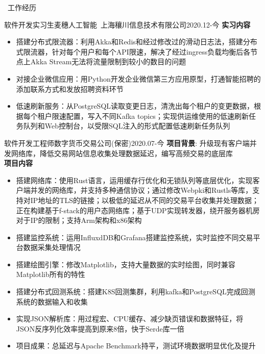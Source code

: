 \documentclass[UTF8]{resume}
\begin{document}
\begin{rSection}{\faBriefcase~工作经历}
    \begin{rExperience}{软件开发实习生}{麦穗人工智能~上海穰川信息技术有限公司}{2020.12-今}
        \textbf{实习内容}
        \begin{itemize}
            \itemsep -0.5em \vspace{-0.5em}
            \item 搭建分布式限流器：利用Akka和Redis和经过修改过的滑动日志法，搭建分布式限流器，针对每个用户和每个API限速，解决了经过ingress负载均衡后各节点上Akka Stream无法将流量限制到较小的数目的问题
            \item 对接企业微信应用：用Python开发企业微信第三方应用原型，打通智能招聘的添加联系方式和发放招聘资料环节
            \item 低速刷新服务：从PostgreSQL读取变更日志，清洗出每个租户的变更数据，根据每个租户限速配置，写入不同Kafka topics；实现供运维使用的低速刷新任务队列和Web控制台，以受限SQL注入的形式配置低速刷新任务队列
        \end{itemize}
    \end{rExperience}
    \begin{rExperience}{软件开发工程师}{数字货币交易公司(保密)}{2020.07-今}
        \textbf{项目背景}:
        升级现有客户端并发网络库，降低交易网站信息收集处理数据延迟，编写高频交易的底层库\\
        \textbf{项目内容}
        \begin{itemize}
            \itemsep -0.5em \vspace{-0.5em}
            \item 搭建网络库：使用Rust语言，运用缓存行优化和无锁队列等底层优化，实现客户端并发的网络库，并支持多种通信协议；通过修改Webpki和Rustls等库，支持对IP地址的TLS的链接；以极低的延迟从不同的交易平台收集并处理数据；正在构建基于f-stack的用户态网络库；基于UDP实现转发器，绕开服务器机房对于IP的限制；支持Arm架构和x86架构
            \item 搭建监控系统：运用InfluxdDB和Grafana搭建监控系统，实时监控不同交易平台数据采集处理情况
            \item 搭建绘图引擎：修改Matplotlib，支持大量数据的实时绘图，同时兼容Matplotlib所有的特性
            \item 搭建分布式回测系统：搭建K8S回测集群，利用kafka和PostgreSQL完成回测系统的数据输入和收集
            \item 实现JSON解析库：用过程宏、CPU缓存、减少缺页错误和数据特征，将JSON反序列化效率提高到原来8倍，快于Serde库一倍
            \item 项目成果：总延迟与Apache Benchmark持平，测试环境数据明显优化及提升
        \end{itemize}
    \end{rExperience}
\end{rSection}
\end{document}
